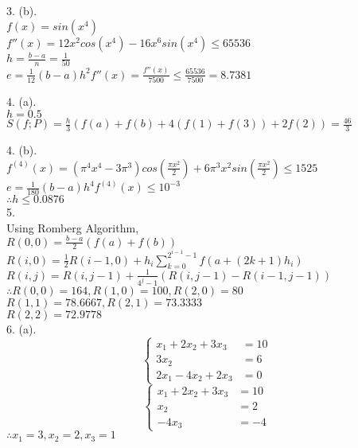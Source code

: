 \documentclass[a4paper]{article}
\begin{document}
3. (b).\\
$f(x)=sin(x^4)$\\
$f''(x)=12x^2cos(x^4)-16x^6sin(x^4)\leq65536$\\
$h=\frac{b-a}{n}=\frac{1}{50}$\\
$e=\frac{1}{12}(b-a)h^2f''(x)=\frac{f''(x)}{7500}\leq\frac{65536}{7500}=8.7381$

4. (a).\\
$h=0.5$\\
$S(f;P)=\frac{h}{3}(f(a)+f(b)+4(f(1)+f(3))+2f(2))=\frac{46}{3}$

4. (b).\\
$f^{(4)}(x)=(\pi^4x^4-3\pi^3)cos(\frac{\pi x^2}{2}) + 6\pi^3x^2sin(\frac{\pi x^2}{2})\leq1525$\\
$e=\frac{1}{180}(b-a)h^4f^{(4)}(x)\leq10^{-3}$\\
$\therefore h\leq0.0876$\\

5.\\
Using Romberg Algorithm,\\
$R(0,0)=\frac{b-a}{2}(f(a)+f(b))$\\
$R(i,0)=\frac{1}{2}R(i-1,0)+h_i \sum\limits_{k=0}^{2^{i-1}-1}f(a+(2k+1)h_i)$\\
$R(i,j)=R(i,j-1)+\frac{1}{4^j-1}(R(i,j-1)-R(i-1,j-1))$\\
$\therefore R(0, 0)=164, R(1,0)=100, R(2,0)=80$\\
$R(1, 1)=78.6667, R(2,1)=73.3333$\\
$R(2, 2)=72.9778$\\

6. (a).\\
\begin{equation}
  \left\{
   \begin{aligned}
       x_1+2x_2+3x_3 &=10\\
       3x_2 &= 6 \\
       2x_1-4x_2+2x_3 &= 0
   \end{aligned}
  \right.
\end{equation}
\begin{equation}
  \left\{
   \begin{aligned}
       x_1+2x_2+3x_3 &=10\\
       x_2 &= 2 \\
       -4x_3 &= -4
   \end{aligned}
  \right.
\end{equation}
$\therefore x_1 =3, x_2=2, x_3=1$\\
\end{document}

